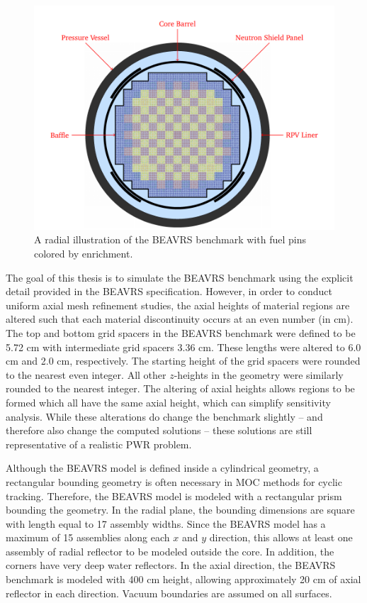 \begin{figure}[h!]
	\centering
	\includegraphics[width=\linewidth]{figures/beavrs-visual/beavrs-assembly-enrichment.png}
	\caption{A radial illustration of the BEAVRS benchmark with fuel pins colored by enrichment.}
	\label{fig:beavrs-assembly-enrichment}
\end{figure} 

The goal of this thesis is to simulate the BEAVRS benchmark using the explicit detail provided in the BEAVRS specification. However, in order to conduct uniform axial mesh refinement studies, the axial heights of material regions are altered such that each material discontinuity occurs at an even number (in cm). The top and bottom grid spacers in the BEAVRS benchmark were defined to be 5.72 cm with intermediate grid spacers 3.36 cm. These lengths were altered to 6.0 cm and 2.0 cm, respectively. The starting height of the grid spacers were rounded to the nearest even integer. All other $z$-heights in the geometry were similarly rounded to the nearest integer. The altering of axial heights allows regions to be formed which all have the same axial height, which can simplify sensitivity analysis. While these alterations do change the benchmark slightly -- and therefore also change the computed solutions -- these solutions are still representative of a realistic \ac{PWR} problem.

Although the BEAVRS model is defined inside a cylindrical geometry, a rectangular bounding geometry is often necessary in \ac{MOC} methods for cyclic tracking. Therefore, the BEAVRS model is modeled with a rectangular prism bounding the geometry. In the radial plane, the bounding dimensions are square with length equal to 17 assembly widths. Since the BEAVRS model has a maximum of 15 assemblies along each $x$ and $y$ direction, this allows at least one assembly of radial reflector to be modeled outside the core. In addition, the corners have very deep water reflectors. In the axial direction, the BEAVRS benchmark is modeled with 400 cm height, allowing approximately 20 cm of axial reflector in each direction. Vacuum boundaries are assumed on all surfaces. 


